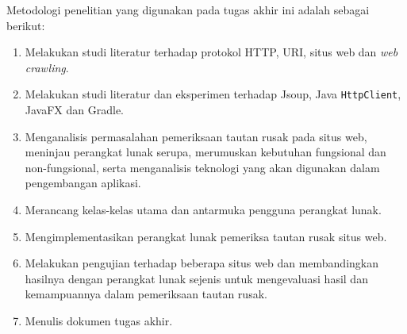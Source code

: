 Metodologi penelitian yang digunakan pada tugas akhir ini adalah sebagai berikut:

\begin{enumerate}

    \item Melakukan studi literatur terhadap protokol HTTP, URI, situs web dan \textit{web crawling}.

    \item Melakukan studi literatur dan eksperimen terhadap Jsoup, Java \texttt{HttpClient}, JavaFX dan Gradle.

    \item Menganalisis permasalahan pemeriksaan tautan rusak pada situs web, meninjau perangkat lunak serupa, merumuskan kebutuhan fungsional dan non-fungsional, serta menganalisis teknologi yang akan digunakan dalam pengembangan aplikasi.

    \item Merancang kelas-kelas utama dan antarmuka pengguna perangkat lunak.
    
    \item Mengimplementasikan perangkat lunak pemeriksa tautan rusak situs web.

    \item Melakukan pengujian terhadap beberapa situs web dan membandingkan hasilnya dengan perangkat lunak sejenis untuk mengevaluasi hasil dan kemampuannya dalam pemeriksaan tautan rusak.
    
    \item Menulis dokumen tugas akhir.
    
\end{enumerate}